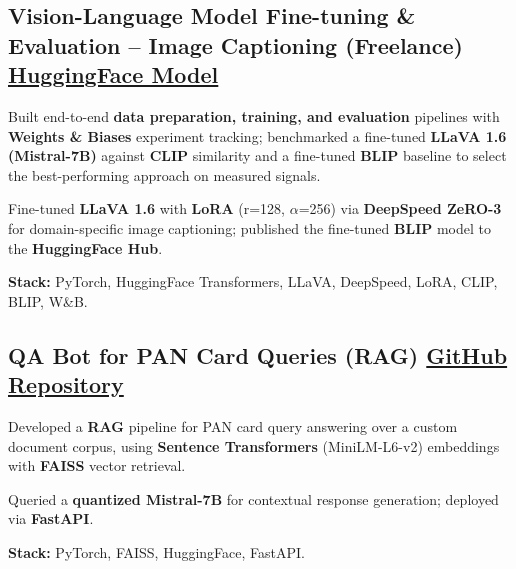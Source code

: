 \documentclass[letter,10pt]{article}
\begin{document}
\subsection{Vision-Language Model Fine-tuning \& Evaluation – Image Captioning (Freelance) \hfill \href{https://huggingface.co/sunil448832/blip-model}{HuggingFace Model}}
\begin{zitemize}
\item Built end-to-end \textbf{data preparation, training, and evaluation} pipelines with \textbf{Weights \& Biases} experiment tracking; benchmarked a fine-tuned \textbf{LLaVA 1.6 (Mistral-7B)} against \textbf{CLIP} similarity and a fine-tuned \textbf{BLIP} baseline to select the best-performing approach on measured signals.
\item Fine-tuned \textbf{LLaVA 1.6} with \textbf{LoRA} (r=128, $\alpha$=256) via \textbf{DeepSpeed ZeRO-3} for domain-specific image captioning; published the fine-tuned \textbf{BLIP} model to the \textbf{HuggingFace Hub}.
\item \textbf{Stack:} PyTorch, HuggingFace Transformers, LLaVA, DeepSpeed, LoRA, CLIP, BLIP, W\&B.
\end{zitemize}

\subsection{QA Bot for PAN Card Queries (RAG) \hfill \href{https://github.com/sunil448832/Natural-Language-Processing/tree/master/RAG(Retrieval\%20Augment\%20Generation)}{GitHub Repository}}
\begin{zitemize}
\item Developed a \textbf{RAG} pipeline for PAN card query answering over a custom document corpus, using \textbf{Sentence Transformers} (MiniLM-L6-v2) embeddings with \textbf{FAISS} vector retrieval.
\item Queried a \textbf{quantized Mistral-7B} for contextual response generation; deployed via \textbf{FastAPI}.
\item \textbf{Stack:} PyTorch, FAISS, HuggingFace, FastAPI.
\end{zitemize}
\end{document}
